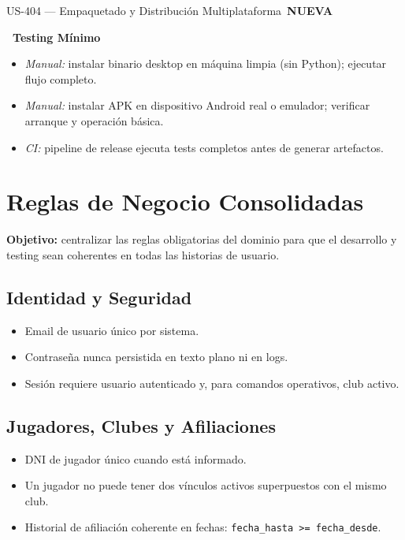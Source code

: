 \documentclass[11pt,a4paper]{article}
\newcommand{\fpath}[1]{\texttt{\small #1}}
\newcommand{\usfield}[2][\;]{%
  \par\vspace{5pt}%
  {\small\textbf{\textcolor{primary}{#2}}}\par\vspace{2pt}%
}
\newcommand{\tagnew}{\,\colorbox{tagnew}{\tiny\bfseries NUEVA}\,}
\begin{document}
\begin{uscard}{US-404 — Empaquetado y Distribución Multiplataforma \tagnew}
\usfield{\faFlask\ Testing Mínimo}
\begin{itemize}[nosep, leftmargin=1.6em]
  \item \textit{Manual:} instalar binario desktop en máquina limpia (sin Python); ejecutar flujo completo.
  \item \textit{Manual:} instalar APK en dispositivo Android real o emulador; verificar arranque y operación básica.
  \item \textit{CI:} pipeline de release ejecuta tests completos antes de generar artefactos.
\end{itemize}

\end{uscard}

\section{Reglas de Negocio Consolidadas}

\textbf{Objetivo:} centralizar las reglas obligatorias del dominio para que el desarrollo y testing sean coherentes en todas las historias de usuario.

\subsection*{Identidad y Seguridad}
\begin{itemize}[nosep]
  \item Email de usuario único por sistema.
  \item Contraseña nunca persistida en texto plano ni en logs.
  \item Sesión requiere usuario autenticado y, para comandos operativos, club activo.
\end{itemize}

\subsection*{Jugadores, Clubes y Afiliaciones}
\begin{itemize}[nosep]
  \item DNI de jugador único cuando está informado.
  \item Un jugador no puede tener dos vínculos activos superpuestos con el mismo club.
  \item Historial de afiliación coherente en fechas: \fpath{fecha\_hasta >= fecha\_desde}.
\end{itemize}
\end{document}
